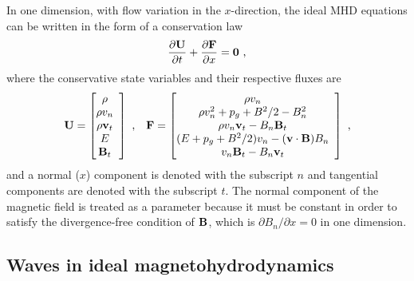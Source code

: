 In one dimension, with flow variation in the $x$-direction, the ideal MHD equations can be written in the form of a conservation law
\begin{gather*}
\frac{\partial \mathbf{U}}{\partial t} + \frac{\partial \mathbf{F}}{\partial x} = \mathbf{0} \text{ ,}
\end{gather*} 
where the conservative state variables  and their respective fluxes  are
\[
\mbf{U} = 
\left[\begin{array}{@{}ccc}
\rho \\
\rho v_n \\
\rho \mbf{v}_{t} \\
E \\
\mbf{B}_{t} \\
\end{array}\right] \text{ ,} 
\quad
\mbf{F} = 
\left[\begin{array}{@{}ccc}
\rho v_n \\
\rho v_n^2 + p_g + B^2/2 - B_n^2 \\
\rho v_n\mbf{v}_{t} - B_n\mbf{B}_{t} \\
(E + p_g + B^2/2)v_n - (\mathbf{v}\cdot\mathbf{B})B_n \\
v_n\mbf{B}_{t} - B_n\mbf{v}_{t} \\
\end{array}\right] \text{ ,}
\]
and a normal ($x$) component is denoted with the subscript $n$ and tangential components are denoted with the subscript $t$.  The normal component of the magnetic field is treated as a parameter because it must be constant in order to satisfy the divergence-free condition of $\mathbf{B}$, which is $\partial{B_n}/\partial{x} = 0$ in one dimension.

\subsection[Waves in ideal magnetohydrodynamics]{Waves in ideal magnetohydrodynamics}
\label{sec:mhd_waves}


